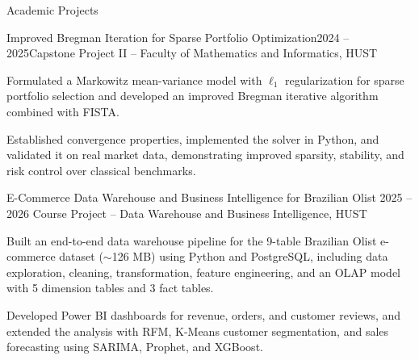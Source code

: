 \documentclass[
a4paper,
12pt,
]{resume}
\begin{document}
\begin{rSection}{Academic Projects}
\begin{rSubsection}
        \end{rSubsection}
        
        \begin{rSubsection}{Improved Bregman Iteration for Sparse Portfolio Optimization}{2024 -- 2025}{Capstone Project II -- Faculty of Mathematics and Informatics, HUST}{}
            \item Formulated a Markowitz mean-variance model with $\ell_1$ regularization
    for sparse portfolio selection and developed an improved Bregman iterative
    algorithm combined with FISTA.
    
            \item Established convergence properties, implemented the solver in Python,
    and validated it on real market data, demonstrating improved sparsity,
    stability, and risk control over classical benchmarks.
        \end{rSubsection}
        
        
        \begin{rSubsection}
            {E-Commerce Data Warehouse and Business Intelligence for Brazilian Olist}
            {2025 -- 2026}
            {Course Project -- Data Warehouse and Business Intelligence, HUST}
            {}
            
            \item Built an end-to-end data warehouse pipeline for the 9-table Brazilian Olist
            e-commerce dataset ($\sim$126 MB) using Python and PostgreSQL, including data
            exploration, cleaning, transformation, feature engineering, and an OLAP model with
            5 dimension tables and 3 fact tables.
            
            \item Developed Power BI dashboards for revenue, orders, and customer reviews,
            and extended the analysis with RFM, K-Means customer segmentation, and sales
            forecasting using SARIMA, Prophet, and XGBoost.
            

\end{rSubsection}
\end{rSection}
\end{document}
